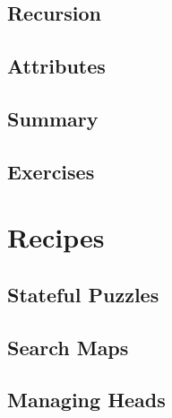 \documentclass[oneside]{book}
\begin{document}
\section{Recursion}
\blindtext

\section{Attributes}
\blindtext

\section{Summary}
\blindtext

\section{Exercises}
\blindtext

\chapter{Recipes}

\section{Stateful Puzzles}
\blindtext

\section{Search Maps}
\blindtext

\section{Managing Heads}
\blindtext









\end{document}
